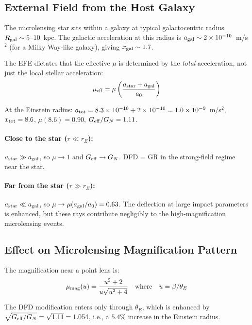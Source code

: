 \documentclass[11pt,a4paper]{article}
\newcommand{\Geff}{G_{\rm eff}}
\newcommand{\ee}[1]{\times 10^{#1}}
\begin{document}
\subsection{External Field from the Host Galaxy}

The microlensing star sits within a galaxy at typical galactocentric
radius $R_{\rm gal} \sim 5$--$10$~kpc.  The galactic acceleration at
this radius is $a_{\rm gal} \sim 2\ee{-10}$~m/s$^2$ (for a Milky
Way-like galaxy), giving $x_{\rm gal} \sim 1.7$.

The EFE dictates that the effective $\mu$ is determined by the
\emph{total} acceleration, not just the local stellar acceleration:
\begin{equation}
\mu_{\rm eff} = \mu\left(\frac{a_{\rm star} + a_{\rm gal}}{a_0}\right)
\end{equation}

At the Einstein radius: $a_{\rm tot} = 8.3\ee{-10} + 2\ee{-10}
= 1.0\ee{-9}$~m/s$^2$, $x_{\rm tot} = 8.6$, $\mu(8.6) = 0.90$,
$\Geff/G_N = 1.11$.

\paragraph{Close to the star ($r \ll r_E$):}
$a_{\rm star} \gg a_{\rm gal}$, so $\mu \to 1$ and $\Geff \to G_N$.
DFD = GR in the strong-field regime near the star.

\paragraph{Far from the star ($r \gg r_E$):}
$a_{\rm star} \ll a_{\rm gal}$, so $\mu \to \mu(a_{\rm gal}/a_0)
= 0.63$.  The deflection at large impact parameters is enhanced,
but these rays contribute negligibly to the high-magnification
microlensing events.

\subsection{Effect on Microlensing Magnification Pattern}

The magnification near a point lens is:
\begin{equation}
\mu_{\rm mag}(u) = \frac{u^2 + 2}{u\sqrt{u^2 + 4}}
\quad\text{where}\quad u = \beta/\theta_E
\end{equation}

The DFD modification enters only through $\theta_E$, which is enhanced
by $\sqrt{\Geff/G_N} = \sqrt{1.11} = 1.054$, i.e., a $5.4\%$ increase
in the Einstein radius.
\end{document}
